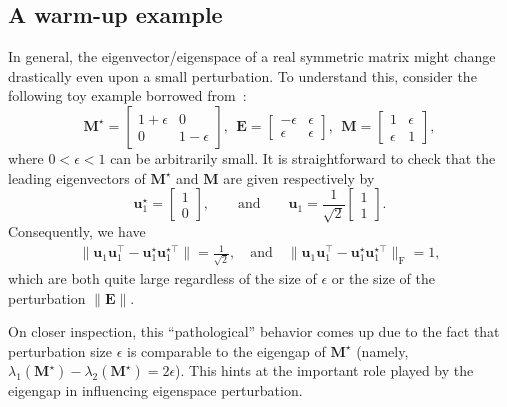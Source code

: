 \subsection{A warm-up example}



In general, the eigenvector/eigenspace of a real symmetric matrix might change drastically even upon a small perturbation.
To understand this, consider the following toy example borrowed from~\citet{hsu2016notes}:
%
\[
\bm{M}^{\star}=\left[\begin{array}{cc}
1+\epsilon & 0\\
0 & 1-\epsilon
\end{array}\right],
~~
\bm{E}=\left[\begin{array}{cc}
-\epsilon & \epsilon\\
\epsilon & \epsilon
\end{array}\right],~~
\bm{M}=\left[\begin{array}{cc}
1 & \epsilon\\
\epsilon & 1
\end{array}\right],
\]
%
where $0<\epsilon<1$ can be arbitrarily small. It is straightforward
to check that the leading eigenvectors of $\bm{M}^{\star}$ and $\bm{M}$ are given respectively by
%
\[
\bm{u}_{1}^{\star}=\left[\begin{array}{c}
1\\
0
\end{array}\right],
\qquad\text{and}\qquad
\bm{u}_{1}=\frac{1}{\sqrt{2}} \left[\begin{array}{c}
1 \\
1
\end{array}\right] .
\]
%
Consequently, we have
%
\begin{align}
	\big\|\bm{u}_{1}\bm{u}_{1}^{\top} - \bm{u}_{1}^{\star}\bm{u}_{1}^{\star\top}\big\| = \frac{1}{\sqrt{2}}, 
	\quad \text{and} \quad
	\big\|\bm{u}_{1}\bm{u}_{1}^{\top} - \bm{u}_{1}^{\star}\bm{u}_{1}^{\star\top}\big\|_{\mathrm{F}}= 1,
\end{align}
%
which are both quite large regardless of the size of $\epsilon$ or the size of the perturbation $\|\bm{E}\|$.



On closer inspection, this ``pathological'' behavior comes up due to the
fact that perturbation size $\epsilon$  is comparable to the
eigengap of $\bm{M}^{\star}$ (namely, $\lambda_{1}(\bm{M}^{\star})-\lambda_{2}(\bm{M}^{\star})=2\epsilon$).
This hints at the important role played by the eigengap in influencing eigenspace perturbation.




